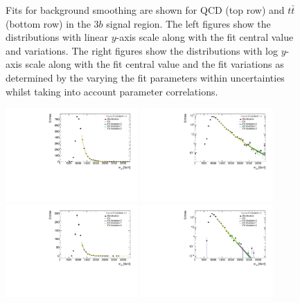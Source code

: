 \begin{figure}[htbp!]
\begin{center}
\caption{Fits for background smoothing are shown for QCD (top row) and $t\bar{t}$ (bottom row) in the $3b$ signal region.  The left figures show the distributions with linear $y$-axis scale along with the fit central value and variations. The right figures show the  distributions with log $y$-axis scale along with the fit central value and the fit variations as determined by the varying the fit parameters within uncertainties whilst taking into account parameter correlations. }
\label{fig:signal-region-3b-smoothing}
\end{center}
\end{figure}

\begin{figure}[htbp!]
\begin{center}
\includegraphics[angle=270, width=0.45\textwidth]{figures/boosted/Smooth/qcd_est_TwoTag_split_Signal_mHH_l.pdf}
\includegraphics[angle=270, width=0.45\textwidth]{figures/boosted/Smooth/qcd_est_TwoTag_split_Signal_mHH_l_l.pdf}\\ 
\includegraphics[angle=270, width=0.45\textwidth]{figures/boosted/Smooth/ttbar_est_TwoTag_split_Signal_mHH_l.pdf}
\includegraphics[angle=270, width=0.45\textwidth]{figures/boosted/Smooth/ttbar_est_TwoTag_split_Signal_mHH_l_l.pdf}

\end{center}
\end{figure}

